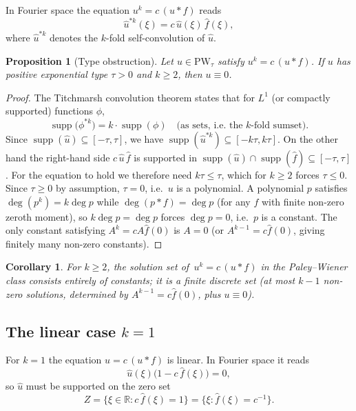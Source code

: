 \documentclass[12pt]{article}
\newtheorem{proposition}[theorem]{Proposition}
\newtheorem{corollary}[theorem]{Corollary}
\DeclareMathOperator{\supp}{supp}
\newcommand{\R}{\mathbb{R}}
\newcommand{\PW}{\mathrm{PW}}
\newcommand{\wh}{\widehat}
\begin{document}
In Fourier space the equation $u^k = c\,(u\ast f)$ reads
\[
  \wh{u}^{\ast k}(\xi) = c\,\wh{u}(\xi)\,\wh{f}(\xi),
\]
where $\wh{u}^{\ast k}$ denotes the $k$-fold self-convolution of $\wh{u}$.

\begin{proposition}[Type obstruction]
  Let $u \in \PW_\tau$ satisfy $u^k = c\,(u\ast f)$.
  If $u$ has \emph{positive} exponential type $\tau > 0$ and
  $k \geq 2$, then $u \equiv 0$.
\end{proposition}

\begin{proof}
  The Titchmarsh convolution theorem states that for $L^1$ (or compactly
  supported) functions $\phi$,
  \[
    \supp\bigl(\phi^{\ast k}\bigr) = k\cdot\supp(\phi)
    \quad\text{(as sets, i.e.\ the $k$-fold sumset).}
  \]
  Since $\supp(\wh{u}) \subseteq [-\tau,\tau]$, we have
  $\supp(\wh{u}^{\ast k}) \subseteq [-k\tau, k\tau]$.
  On the other hand the right-hand side $c\,\wh{u}\,\wh{f}$ is supported in
  $\supp(\wh{u})\cap\supp(\wh{f}) \subseteq [-\tau, \tau]$.
  For the equation to hold we therefore need $k\tau \leq \tau$, which for
  $k \geq 2$ forces $\tau \leq 0$.
  Since $\tau \geq 0$ by assumption, $\tau = 0$, i.e.\ $u$ is a polynomial.
  A polynomial $p$ satisfies $\deg(p^k) = k\deg p$ while
  $\deg(p \ast f) = \deg p$ (for any $f$ with finite non-zero zeroth moment),
  so $k\deg p = \deg p$ forces $\deg p = 0$, i.e.\ $p$ is a constant.
  The only constant satisfying $A^k = cA\wh{f}(0)$ is
  $A = 0$ (or $A^{k-1} = c\wh{f}(0)$, giving finitely many non-zero
  constants).
\end{proof}

\begin{corollary}
  For $k \geq 2$, the solution set of\, $u^k = c\,(u\ast f)$ in the
  Paley--Wiener class consists entirely of constants; it is a
  \emph{finite discrete set} (at most $k-1$ non-zero solutions, determined
  by $A^{k-1} = c\wh{f}(0)$, plus $u \equiv 0$).
\end{corollary}

\subsection{The linear case \texorpdfstring{$k = 1$}{k=1}}

For $k = 1$ the equation $u = c\,(u\ast f)$ is linear.
In Fourier space it reads
\[
  \wh{u}(\xi)\bigl(1 - c\,\wh{f}(\xi)\bigr) = 0,
\]
so $\wh{u}$ must be supported on the zero set
\[
  Z = \bigl\{\xi \in \R : c\,\wh{f}(\xi) = 1\bigr\}
    = \bigl\{\xi : \wh{f}(\xi) = c^{-1}\bigr\}.
\]
\end{document}
